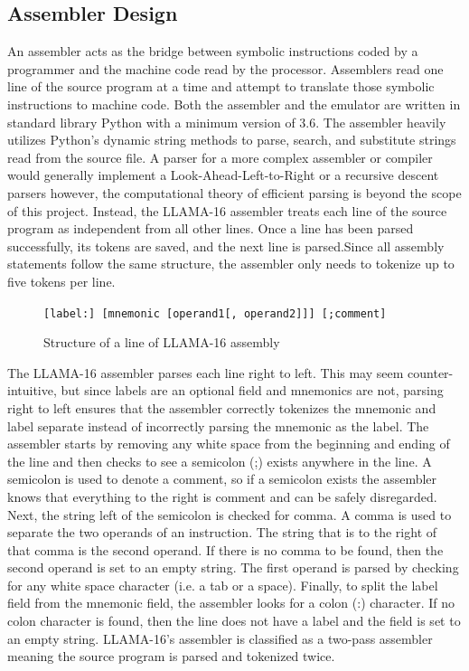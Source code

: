 \documentclass[man,hidelinks,floatsintext]{apa7}
\begin{document}
\subsection{Assembler Design}
An assembler acts as the bridge between symbolic instructions coded by a programmer and the machine code read by the processor. Assemblers read one line of the source program at a time and attempt to translate those symbolic instructions to machine code. Both the assembler and the emulator are written in standard library Python with a minimum version of 3.6. The assembler heavily utilizes Python's dynamic string methods to parse, search, and substitute strings read from the source file. A parser for a more complex assembler or compiler would generally implement a Look-Ahead-Left-to-Right or a recursive descent parsers however, the computational theory of efficient parsing is beyond the scope of this project. Instead, the LLAMA-16 assembler treats each line of the source program as independent from all other lines. Once a line has been parsed successfully, its tokens are saved, and the next line is parsed.Since all assembly statements follow the same structure, the assembler only needs to tokenize up to five tokens per line.\par
\vspace{5mm}
\begin{figure}[h]
  \centering
  \captionsetup{justification=centering}
  \verb|[label:] [mnemonic [operand1[, operand2]]] [;comment]|
  \vspace*{3mm}
  \caption{Structure of a line of LLAMA-16 assembly}
\end{figure}
The LLAMA-16 assembler parses each line right to left. This may seem counter-intuitive, but since labels are an optional field and mnemonics are not, parsing right to left ensures that the assembler correctly tokenizes the mnemonic and label separate instead of incorrectly parsing the mnemonic as the label. The assembler starts by removing any white space from the beginning and ending of the line and then checks to see a semicolon (;) exists anywhere in the line. A semicolon is used to denote a comment, so if a semicolon exists the assembler knows that everything to the right is comment and can be safely disregarded. Next, the string left of the semicolon is checked for comma. A comma is used to separate the two operands of an instruction. The string that is to the right of that comma is the second operand. If there is no comma to be found, then the second operand is set to an empty string. The first operand is parsed by checking for any white space character (i.e. a tab or a space). Finally, to split the label field from the mnemonic field, the assembler looks for a colon (:) character. If no colon character is found, then the line does not have a label and the field is set to an empty string. LLAMA-16's assembler is classified as a two-pass assembler meaning the source program is parsed and tokenized twice.
\end{document}
